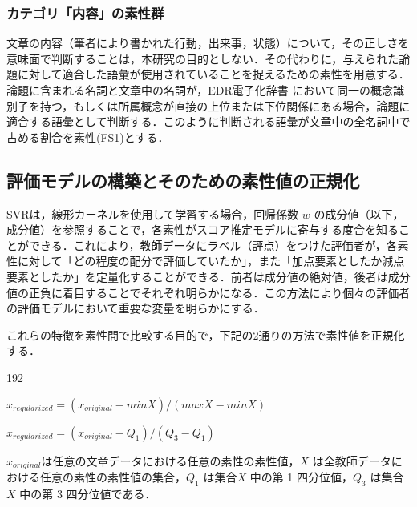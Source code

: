 \documentclass[japanese]{jnlp_1.5}
\let\underline
\newenvironment{indent1zw}{}{}
\begin{document}


\subsubsection{カテゴリ「内容」の素性群}

文章の内容（筆者により書かれた行動，出来事，状態）について，その正しさを意味面で判断することは，本研究の目的としない．その代わりに，与えられた論題に対して適合した語彙が使用されていることを捉えるための素性を用意する．論題に含まれる名詞と文章中の名詞が，EDR電子化辞書
\cite{NihonDenshikaJishoKenkyujo2010}
において同一の概念識別子を持つ，もしくは所属概念が直接の上位または下位関係にある場合，論題に適合する語彙として判断する．このように判断される語彙が文章中の全名詞中で占める割合を素性(FS1)とする．



\subsection{評価モデルの構築とそのための素性値の正規化}

SVRは，線形カーネルを使用して学習する場合，回帰係数 $w$ の成分値（以下，成分値）を参照することで，各素性がスコア推定モデルに寄与する度合を知ることができる．これにより，教師データにラベル（評点）をつけた評価者が，各素性に対して「どの程度の配分で評価していたか」，また「加点要素としたか減点要素としたか」を定量化することができる．前者は成分値の絶対値，後者は成分値の正負に着目することでそれぞれ明らかになる．この方法により個々の評価者の評価モデルにおいて重要な変量を明らかにする．

これらの特徴を素性間で比較する目的で，下記の2通りの方法で素性値を正規化する．

\begin{dingautolist}{192}
\item $x_{regularized}=(x_{original}-minX)/(maxX-minX)$ 
\item $x_{regularized}=(x_{original}-Q_{1})/(Q_{3}-Q_{1})$
\end{dingautolist}

$x_{original}$は任意の文章データにおける任意の素性の素性値，$X$ は全教師データにおける任意の素性の素性値の集合，$Q_{1}$ は集合$X$ 中の第 1 四分位値，$Q_{3}$ は集合$X$ 中の第 3 四分位値である．
\end{document}
